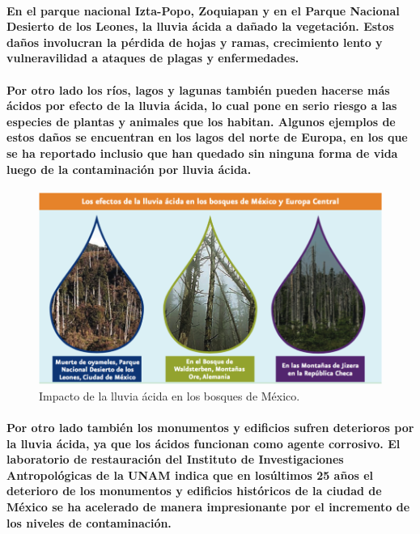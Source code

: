    \paragraph {En el parque nacional Izta-Popo, Zoquiapan y en el Parque Nacional Desierto de los Leones, la lluvia ácida a dañado la vegetación. Estos daños involucran la pérdida de hojas y ramas, crecimiento lento y vulneravilidad a ataques de plagas y enfermedades.}
  
    \paragraph {Por otro lado los ríos, lagos y lagunas también pueden hacerse más ácidos por efecto de la lluvia ácida, lo cual pone en serio riesgo a las especies de plantas y animales que los habitan. Algunos ejemplos de estos daños se encuentran en los lagos del norte de Europa, en los que se ha reportado inclusio que han quedado sin ninguna forma de vida luego de la contaminación por lluvia ácida.}

    \begin{figure}[h!]
      \centering
        \includegraphics[width=\textwidth]{./images/2.png}      
      \caption{Impacto de la lluvia ácida en los bosques de México.}
    \end{figure}    

    \paragraph {Por otro lado también los monumentos y edificios sufren deterioros por la lluvia ácida, ya que los ácidos funcionan como agente corrosivo. El laboratorio de restauración del Instituto de Investigaciones Antropológicas de la UNAM indica que en losúltimos 25 años el deterioro de los monumentos y edificios históricos de la ciudad de México se ha acelerado de manera impresionante por el incremento de los niveles de contaminación.}

